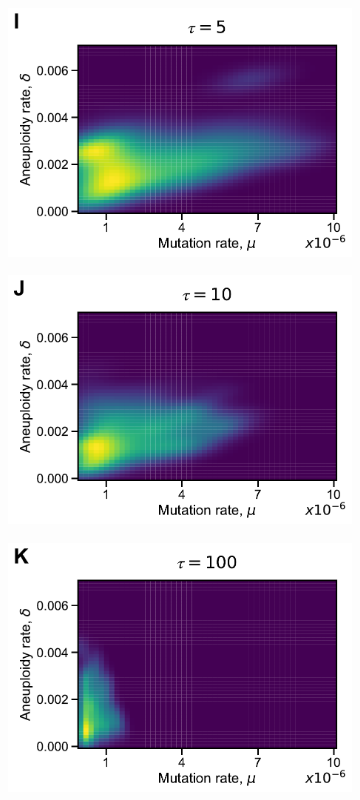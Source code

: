 \documentclass[12pt]{extarticle}
\begin{document}
\begin{figure}[p]
\begin{subfigure}{0.325\textwidth}
      \includegraphics[width=\textwidth]{../figures/tau-joint-I.pdf}      
  \end{subfigure}
\begin{subfigure}{0.325\textwidth}
      \includegraphics[width=\textwidth]{../figures/tau-joint-J.pdf}      
  \end{subfigure}
\begin{subfigure}{0.325\textwidth}
      \includegraphics[width=\textwidth]{../figures/tau-joint-K.pdf}      

\end{subfigure}
\end{figure}
\end{document}
